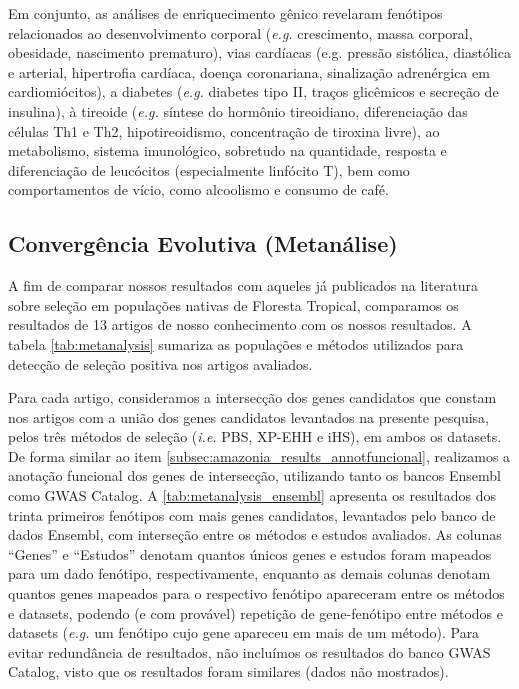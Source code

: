 

\hspace{2em}

Em conjunto, as análises de enriquecimento gênico revelaram fenótipos relacionados ao desenvolvimento corporal (\emph{e.g.} crescimento, massa corporal, obesidade, nascimento prematuro), vias cardíacas (e.g. pressão sistólica, diastólica e arterial, hipertrofia cardíaca, doença coronariana, sinalização adrenérgica em cardiomiócitos), a diabetes (\emph{e.g.} diabetes tipo II, traços glicêmicos e secreção de insulina), à tireoide (\emph{e.g.} síntese do hormônio tireoidiano, diferenciação das células Th1 e Th2, hipotireoidismo, concentração de tiroxina livre), ao metabolismo, sistema imunológico, sobretudo na quantidade, resposta e diferenciação de leucócitos (especialmente linfócito T), bem como comportamentos de vício, como alcoolismo e consumo de café.

\subsection{Convergência Evolutiva (Metanálise)}

A fim de comparar nossos resultados com aqueles já publicados na literatura sobre seleção em populações nativas de Floresta Tropical, comparamos os resultados de 13 artigos de nosso conhecimento com os nossos resultados. A tabela \ref{tab:metanalysis} sumariza as populações e métodos utilizados para detecção de seleção positiva nos artigos avaliados.

\vspace{\onelineskip}


Para cada artigo, consideramos a intersecção dos genes candidatos que constam nos artigos com a união dos genes candidatos levantados na presente pesquisa, pelos três métodos de seleção (\emph{i.e.} PBS, XP-EHH e iHS), em ambos os datasets. De forma similar ao item \ref{subsec:amazonia_results_annotfuncional}, realizamos a anotação funcional dos genes de intersecção, utilizando tanto os bancos Ensembl como GWAS Catalog. A \autoref{tab:metanalysis_ensembl} apresenta os resultados dos trinta primeiros fenótipos com mais genes candidatos, levantados pelo banco de dados Ensembl, com interseção entre os métodos e estudos avaliados. As colunas “Genes” e “Estudos” denotam quantos únicos genes e estudos foram mapeados para um dado fenótipo, respectivamente, enquanto as demais colunas denotam quantos genes mapeados para o respectivo fenótipo apareceram entre os métodos e datasets, podendo (e com provável) repetição de gene-fenótipo entre métodos e datasets (\emph{e.g.} um fenótipo cujo gene apareceu em mais de um método). Para evitar redundância de resultados, não incluímos os resultados do banco GWAS Catalog, visto que os resultados foram similares (dados não mostrados).

